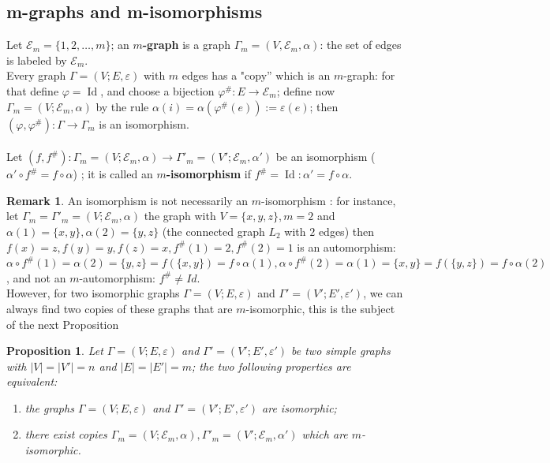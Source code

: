 \documentclass[preprint,12pt,authoryear]{elsarticle}
\newtheorem{prop}[thm]{Proposition}
\theoremstyle{definition}
\newtheorem{rem}{Remark}
\DeclareMathOperator{\Id}{Id}
\begin{document}
\subsection{m-graphs and m-isomorphisms} 

Let $\mathcal{E}_m=\{1, 2, \ldots, m \}$; an {\bf $m$-graph} is a graph $\Gamma_{m}=(V, \mathcal{E}_m, \alpha)$: the set of edges is labeled by $\mathcal{E}_m$.\\




\noindent Every  graph $\Gamma=(V;E, \varepsilon)$ with $m$ edges has a "copy''  which is an $m$-graph:
for that define $\varphi =\Id$, and choose   a bijection $\varphi^{\#}: E \longrightarrow \mathcal{E}_m$; define now 
$\Gamma_{m}=(V; \mathcal{E}_m, \alpha) $ by the rule $\alpha(i)= \alpha(\varphi^{\#}(e)):= \varepsilon(e)$; then 
$(\varphi, \varphi^{\#}) : \Gamma \longrightarrow \Gamma_m$ is an isomorphism.\\\\
Let $(f,f^{\#})  : \Gamma_m=(V;\mathcal{E}_m ,\alpha) \longrightarrow \Gamma'_m=(V';\mathcal{E}_m,\alpha')$ be an isomorphism 
($\alpha' \circ f^{\#}=f \circ \alpha$) ; it is called an  {\bf $m$-isomorphism} if  $f^{\#}=\Id: \alpha' =f \circ \alpha$.

\begin{rem} An isomorphism is not necessarily an $m$-isomorphism : for instance,  let 
$\Gamma_m =\Gamma'_m =(V;\mathcal{E}_m, \alpha)$ the graph with $V=\{x, y, z \}, m=2$ and $\alpha(1)=\{x, y\}, 
\alpha(2)=\{y, z \}$ (the connected graph $L_2$ with $2$ edges) then 
$f(x)=z, f(y)=y, f(z)=x, f^{\#}(1)=2, f^{\#}(2)=1$ is an automorphism: $\alpha \circ f^{\#}(1)= \alpha(2)=\{y,z\}=f(\{x,y\})=f\circ \alpha(1),
\alpha \circ f^{\#}(2)= \alpha(1)=\{x,y\}=f(\{y,z\})=f\circ \alpha(2)$, and  not an $m$-automorphism: $f^{\#} \neq Id$.\\
However, for two isomorphic graphs $\Gamma=(V;E, \varepsilon)$ and $\Gamma'=(V';E', \varepsilon')$, we can always find two copies of these graphs that are $m$-isomorphic, this is the subject of the next Proposition
\end{rem}



\begin{prop} \label{m-grahsIso} Let $\Gamma=(V;E,\varepsilon)$ and  $\Gamma'=(V';E', \varepsilon')$ be two simple graphs with $\vert V\vert =\vert V'\vert =n$ and  $\vert E\vert =\vert E'\vert =m$; the two following properties are equivalent:
\begin{enumerate}
\item[i)] the graphs $\Gamma=(V;E,\varepsilon)$ and  $\Gamma'=(V';E', \varepsilon')$ are isomorphic;
\item[ii)]  there exist copies 
 $\Gamma_m=(V; \mathcal{E}_m, \alpha), \Gamma'_m=(V';\mathcal{E}_m,\alpha')$ which are $m$-isomorphic.
\end{enumerate}

\end{prop}
\end{document}
